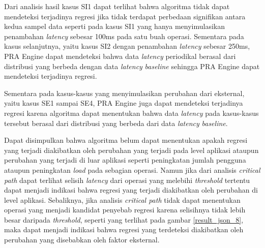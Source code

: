 Dari analisis hasil kasus SI1 dapat terlihat bahwa algoritma tidak dapat mendeteksi terjadinya regresi jika tidak terdapat perbedaan signifikan antara kedua sampel data seperti pada kasus SI1 yang hanya menyimulasikan penambahan \textit{latency} sebesar 100ms pada satu buah operasi. Sementara pada kasus selanjutnya, yaitu kasus SI2 dengan penambahan \textit{latency} sebesar 250ms, PRA Engine dapat mendeteksi bahwa data \textit{latency} periodikal berasal dari distribusi yang berbeda dengan data \textit{latency} \textit{baseline} sehingga PRA Engine dapat mendeteksi terjadinya regresi.

Sementara pada kasus-kasus yang menyimulasikan perubahan dari eksternal, yaitu kasus SE1 sampai SE4, PRA Engine juga dapat mendeteksi terjadinya regresi karena algoritma dapat menentukan bahwa data \textit{latency} pada kasus-kasus tersebut berasal dari distribusi yang berbeda dari data \textit{latency} \textit{baseline}.

Dapat disimpulkan bahwa algoritma belum dapat menentukan apakah regresi yang terjadi diakibatkan oleh perubahan yang terjadi pada level aplikasi ataupun perubahan yang terjadi di luar aplikasi seperti peningkatan jumlah pengguna ataupun peningkatan \textit{load} pada sebagian operasi. Namun jika dari analisis \textit{critical path} dapat terlihat selisih \textit{latency} dari operasi yang melebihi \textit{threshold} tertentu dapat menjadi indikasi bahwa regresi yang terjadi diakibatkan oleh perubahan di level aplikasi. Sebaliknya, jika analisis \textit{critical path} tidak dapat menentukan operasi yang menjadi kandidat penyebab regresi karena selisihnya tidak lebih besar daripada \textit{threshold}, seperti yang terlihat pada gambar \ref{result_json_8}, maka dapat menjadi indikasi bahwa regresi yang terdeteksi diakibatkan oleh perubahan yang disebabkan oleh faktor eksternal.
